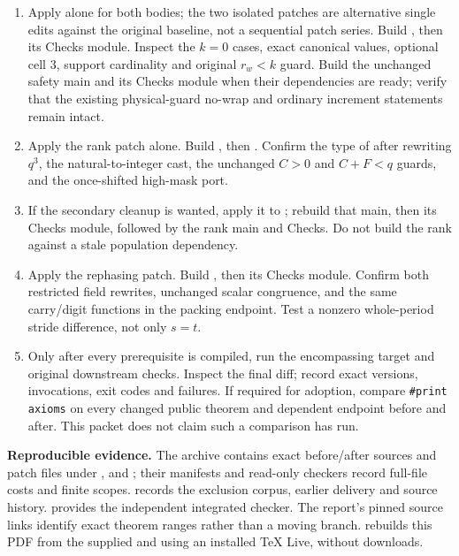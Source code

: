 \begin{enumerate}
\item Apply  alone for both bodies; the two isolated patches are alternative single edits against the original baseline, not a sequential patch series. Build , then its Checks module. Inspect the $k=0$ cases, exact canonical values, optional cell $3$, support cardinality and original $r_w<k$ guard. Build the unchanged safety main and its Checks module when their dependencies are ready; verify that the existing physical-guard no-wrap and ordinary increment statements remain intact.
\item Apply the rank patch alone. Build , then . Confirm the type of  after rewriting $q^3$, the natural-to-integer cast, the unchanged $C>0$ and $C+F<q$ guards, and the once-shifted high-mask port.
\item If the secondary cleanup is wanted, apply it to ; rebuild that main, then its Checks module, followed by the rank main and Checks. Do not build the rank against a stale population dependency.
\item Apply the rephasing patch. Build , then its Checks module. Confirm both restricted field rewrites, unchanged scalar congruence, and the same carry/digit functions in the packing endpoint. Test a nonzero whole-period stride difference, not only $s=t$.
\item Only after every prerequisite is compiled, run the encompassing target and original downstream checks. Inspect the final diff; record exact versions, invocations, exit codes and failures. If required for adoption, compare \texttt{\#print axioms} on every changed public theorem and dependent endpoint before and after. This packet does not claim such a comparison has run.
\end{enumerate}

\textbf{Reproducible evidence.} The archive contains exact before/after sources and patch files under ,  and ; their manifests and read-only checkers record full-file costs and finite scopes.  records the exclusion corpus, earlier delivery and source history.  provides the independent integrated checker. The report's pinned source links identify exact theorem ranges rather than a moving branch.  rebuilds this PDF from the supplied  and  using an installed TeX Live, without downloads.

